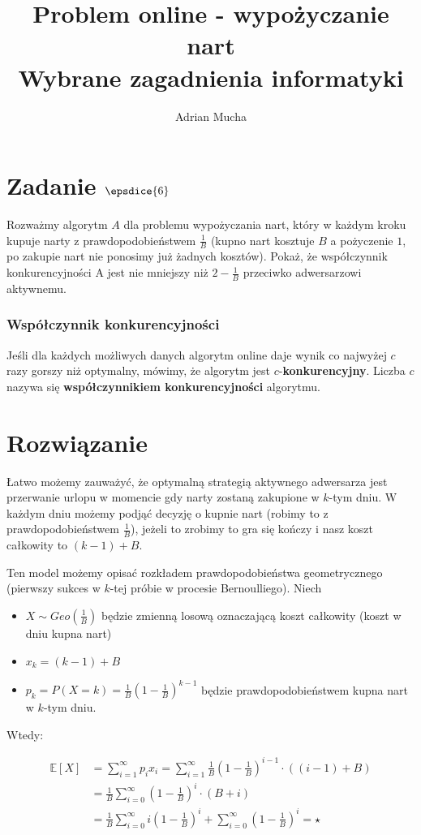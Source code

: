 \documentclass{homeworg}
\title{
    Problem online - wypożyczanie nart \\
    \large Wybrane zagadnienia informatyki
}
\author{Adrian Mucha}
\begin{document}
\maketitle

\section*{Zadanie $\epsdice{6}$}
Rozważmy algorytm $A$ dla problemu wypożyczania nart, który w każdym kroku kupuje narty z prawdopodobieństwem $\frac{1}{B}$ (kupno nart kosztuje $B$ a pożyczenie $1$, po zakupie nart nie ponosimy już żadnych kosztów). Pokaż, że współczynnik konkurencyjności A jest nie mniejszy niż $2 - \frac{1}{B}$ przeciwko adwersarzowi aktywnemu.

\subsubsection*{Współczynnik konkurencyjności}
Jeśli dla każdych możliwych danych algorytm online daje wynik co najwyżej $c$ razy gorszy niż optymalny, mówimy, że algorytm jest $c$-\textbf{konkurencyjny}. Liczba $c$ nazywa się \textbf{współczynnikiem konkurencyjności} algorytmu.

\section*{Rozwiązanie}
Łatwo możemy zauważyć, że optymalną strategią aktywnego adwersarza jest przerwanie urlopu w momencie gdy narty zostaną zakupione w $k$-tym dniu. W każdym dniu możemy podjąć decyzję o kupnie nart (robimy to z prawdopodobieństwem $\frac{1}{B}$), jeżeli to zrobimy to gra się kończy i nasz koszt całkowity to $(k - 1) + B$.

Ten model możemy opisać rozkładem prawdopodobieństwa geometrycznego (pierwszy sukces w $k$-tej próbie w procesie Bernoulliego). Niech

\begin{itemize}
    \item $X \sim Geo(\frac{1}{B})$ będzie zmienną losową oznaczającą koszt całkowity (koszt w dniu kupna nart)
    \item $x_k = (k - 1) + B$
    \item $p_k = P(X = k) = \frac{1}{B}(1 - \frac{1}{B})^{k-1}$ będzie prawdopodobieństwem kupna nart w $k$-tym dniu.
\end{itemize}

Wtedy:

\begin{align*}
    \mathbb{E}[X] &= \sum_{i=1}^{\infty} p_i x_i = \sum_{i=1}^{\infty}\frac{1}{B}\left(1 - \frac{1}{B}\right)^{i-1} \cdot ((i - 1) + B) \\
    &= \frac{1}{B}\sum_{i=0}^{\infty}\left(1 - \frac{1}{B}\right)^i \cdot (B + i) \\
    &= \frac{1}{B}\sum_{i=0}^{\infty}i\left(1 - \frac{1}{B}\right)^i + \sum_{i=0}^{\infty}\left(1 - \frac{1}{B}\right)^i = \star
\end{align*}
\end{document}

